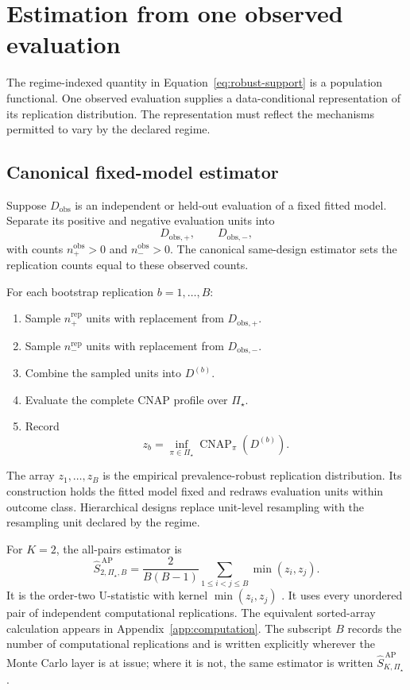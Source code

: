 \documentclass[11pt]{article}
\newcommand{\CNAP}{\operatorname{CNAP}}
\newcommand{\PSet}{\Pi_\star}
\newcommand{\SRobHat}{\widehat S_{K,\PSet}^{\,\mathrm{AP}}}
\theoremstyle{remark}
\begin{document}
\section{Estimation from one observed evaluation}
\label{sec:estimation}

The regime-indexed quantity in Equation~\eqref{eq:robust-support} is a population functional. One observed evaluation supplies a data-conditional representation of its replication distribution. The representation must reflect the mechanisms permitted to vary by the declared regime.

\subsection{Canonical fixed-model estimator}

Suppose $D_{\mathrm{obs}}$ is an independent or held-out evaluation of a fixed fitted model. Separate its positive and negative evaluation units into
\[
D_{\mathrm{obs},+},
\qquad
D_{\mathrm{obs},-},
\]
with counts $n_+^{\mathrm{obs}}>0$ and $n_-^{\mathrm{obs}}>0$. The canonical same-design estimator sets the replication counts equal to these observed counts.

For each bootstrap replication $b=1,\ldots,B$:
\begin{enumerate}
\item Sample $n_+^{\mathrm{rep}}$ units with replacement from $D_{\mathrm{obs},+}$.
\item Sample $n_-^{\mathrm{rep}}$ units with replacement from $D_{\mathrm{obs},-}$.
\item Combine the sampled units into $D^{(b)}$.
\item Evaluate the complete CNAP profile over $\PSet$.
\item Record
\begin{equation}
z_b
=
\inf_{\pi\in\PSet}
\CNAP_\pi(D^{(b)}).
\label{eq:bootstrap-robust-effect}
\end{equation}
\end{enumerate}

The array $z_1,\ldots,z_B$ is the empirical prevalence-robust replication distribution. Its construction holds the fitted model fixed and redraws evaluation units within outcome class. Hierarchical designs replace unit-level resampling with the resampling unit declared by the regime.

For $K=2$, the all-pairs estimator is
\begin{equation}
\widehat S_{2,\PSet,B}^{\,\mathrm{AP}}
=
\frac{2}{B(B-1)}
\sum_{1\leq i<j\leq B}
\min(z_i,z_j).
\label{eq:all-pairs-estimator}
\end{equation}
It is the order-two U-statistic with kernel $\min(z_i,z_j)$ \cite{hoeffding1948ustat}. It uses every unordered pair of independent computational replications. The equivalent sorted-array calculation appears in Appendix~\ref{app:computation}. The subscript $B$ records the number of computational replications and is written explicitly wherever the Monte Carlo layer is at issue; where it is not, the same estimator is written $\SRobHat$.
\end{document}
